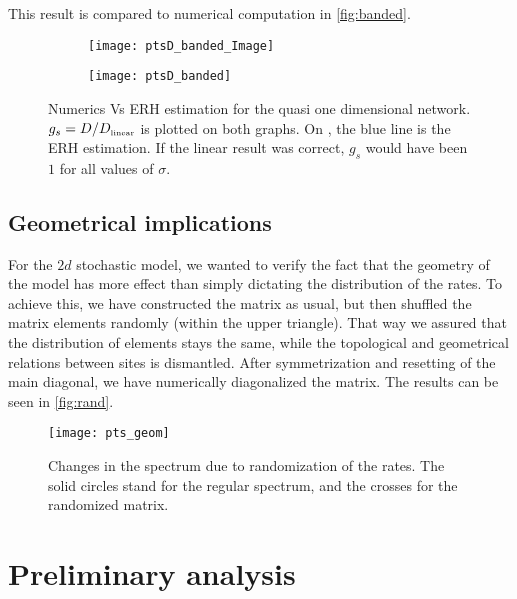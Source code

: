 This result is compared to numerical computation in \autoref{fig:banded}.

\begin{figure}
\begin{subfigure}{0.49\textwidth}
\texttt{[image: ptsD\_banded\_Image]}
\label{fig:band_image}
\end{subfigure}
\begin{subfigure}{0.49\textwidth}
\texttt{[image: ptsD\_banded]}
\label{fig:band_b10}
\end{subfigure}
\caption[Banded network]{Numerics Vs ERH estimation for the quasi one dimensional network. $g_s = D/D_{\mbox{\tiny linear}}$ is plotted on both graphs.
On , the blue line is the ERH estimation. If the
linear result was correct, $g_s$ would have been $1$ for all values of $\sigma$.}
\label{fig:banded}
\end{figure}



\section{Geometrical implications}


For the $2d$ stochastic model, we wanted to verify the fact that
the geometry of the model has more effect than simply dictating the distribution
of the rates. To achieve this, we have constructed the matrix as usual, but
then shuffled the matrix elements randomly (within the upper triangle). That way
we assured that the distribution of elements stays the same, while the topological
and geometrical relations between sites is dismantled. After symmetrization
and resetting of the main diagonal, we have numerically diagonalized the matrix. The
results can be seen in \autoref{fig:rand}.


\begin{figure}
\texttt{[image: pts\_geom]}
\caption{Changes in the spectrum due to randomization of the rates. The solid circles 
  stand for the regular spectrum, and the crosses for the randomized matrix.}
\label{fig:rand}
\end{figure}


\chapter{Preliminary analysis}


